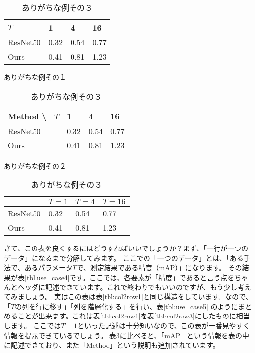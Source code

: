 \documentclass[uplatex,onecolumn,9pt,dvipdfmx]{jsarticle}
\newcommand{\Tref}[1]{表\ref{#1}}
\begin{document}
\begin{table}[h]
    \begin{minipage}{0.32\linewidth}
        \centering
        \begin{tabular}{@{}llll@{}} \toprule
            $T$ & 1 & 4 & 16 \\ \midrule
            ResNet50  & 0.32 & 0.54 & 0.77 \\ 
            Ours      & 0.41 & 0.81 & 1.23 \\ \bottomrule   
        \end{tabular}
        \caption{ありがちな例その１}
        \label{tbl:use_case1}
    \end{minipage}
    \hfill
    \begin{minipage}{0.32\linewidth}
        \centering
        \begin{tabular}{|l|lll|} \hline
            Method \textbackslash ~ $T$ & 1 & 4 & 16 \\ \hline
            ResNet50  & 0.32 & 0.54 & 0.77 \\ 
            Ours      & 0.41 & 0.81 & 1.23 \\ \hline
        \end{tabular}
        \caption{ありがちな例その２}
        \label{tbl:use_case2}
    \end{minipage}
    \hfill
    \begin{minipage}{0.32\linewidth}
        \centering
        \begin{tabular}{@{}llll@{}} \toprule
            & $T=1$ & $T=4$ & $T=16$ \\ \midrule
            ResNet50  & 0.32 & 0.54 & 0.77 \\ 
            Ours      & 0.41 & 0.81 & 1.23 \\ \bottomrule   
        \end{tabular}
        \caption{ありがちな例その３}
        \label{tbl:use_case3}
    \end{minipage}
\end{table}

さて、この表を良くするにはどうすればいいでしょうか？まず、「一行が一つのデータ」になるまで分解してみます。
ここでの「一つのデータ」とは、「ある手法で、あるパラメータ$T$で、測定結果である精度（mAP）」になります。
その結果が\Tref{tbl:use_case4}です。ここでは、各要素が「精度」であると言う点をちゃんとヘッダに記述できています。これで終わりでもいいのですが、もう少し考えてみましょう。
実はこの表は\Tref{tbl:col2row1}と同じ構造をしています。なので、「$T$の列を行に移す」「列を階層化する」を行い、\Tref{tbl:use_case5}
のようにまとめることが出来ます。これは\Tref{tbl:col2row1}を\Tref{tbl:col2row3}にしたものに相当します。
ここでは$T=1$といった記述は十分短いなので、この表が一番見やすく情報を提示できているでしょう。
\Tref{tbl:use_case3}に比べると、「mAP」という情報を表の中に記述できており、また「Method」という説明も追加されています。
\end{document}
